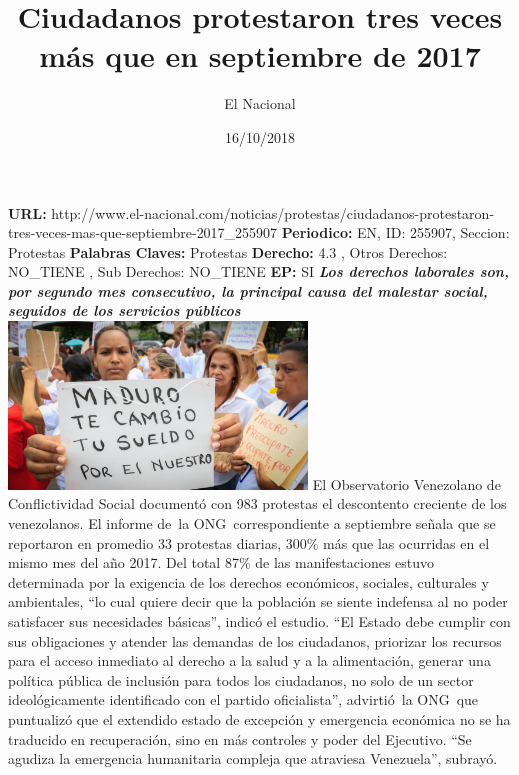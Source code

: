 \documentclass{article}%
\title{\textbf{Ciudadanos protestaron tres veces más que en septiembre de 2017}}%
\author{El Nacional}%
\date{16/10/2018}%
\begin{document}
%
\normalsize%
\maketitle%
\textbf{URL: }%
http://www.el{-}nacional.com/noticias/protestas/ciudadanos{-}protestaron{-}tres{-}veces{-}mas{-}que{-}septiembre{-}2017\_255907\newline%
%
\textbf{Periodico: }%
EN, %
ID: %
255907, %
Seccion: %
Protestas\newline%
%
\textbf{Palabras Claves: }%
Protestas\newline%
%
\textbf{Derecho: }%
4.3%
, Otros Derechos: %
NO\_TIENE%
, Sub Derechos: %
NO\_TIENE%
\newline%
%
\textbf{EP: }%
SI\newline%
\newline%
%
\textbf{\textit{Los derechos laborales son, por segundo mes consecutivo, la principal causa del malestar social, seguidos de los servicios públicos}}%
\newline%
\newline%
%
\includegraphics[width=300px]{12.jpg}%
\newline%
%
El Observatorio Venezolano de Conflictividad Social documentó con 983 protestas el descontento creciente de los venezolanos. El informe de~la ONG~correspondiente a septiembre señala que se reportaron en promedio 33 protestas diarias, 300\% más que las ocurridas en el mismo mes del año 2017. Del total 87\% de las manifestaciones estuvo determinada por la exigencia de los derechos económicos, sociales, culturales y ambientales, “lo cual quiere decir que la población se siente indefensa al no poder satisfacer sus necesidades básicas”, indicó el estudio.%
\newline%
%
“El Estado debe cumplir con sus obligaciones y atender las demandas de los ciudadanos, priorizar los recursos para el acceso inmediato al derecho a la salud y a la alimentación, generar una política pública de inclusión para todos los ciudadanos, no solo de un sector ideológicamente identificado con el partido oficialista”, advirtió~la ONG~que puntualizó que el extendido estado de excepción y emergencia económica no se ha traducido en recuperación, sino en más controles y poder del Ejecutivo. “Se agudiza la emergencia humanitaria compleja que atraviesa Venezuela”, subrayó.%
\end{document}
